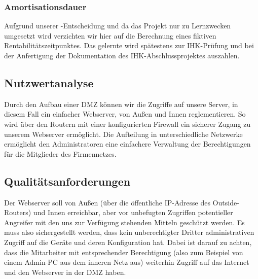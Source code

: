 
\subsubsection{Amortisationsdauer}
\label{sec:Amortisationsdauer}
Aufgrund unserer -Entscheidung und da das Projekt nur zu Lernzwecken umgesetzt wird verzichten wir hier auf die Berechnung eines fiktiven Rentabilitätszeitpunktes. Das gelernte wird spätestens zur \ac{IHK}-Prüfung und bei der Anfertigung der Dokumentation des \ac{IHK}-Abschlussprojektes auszahlen.

\subsection{Nutzwertanalyse}
\label{sec:Nutzwertanalyse}
Durch den Aufbau einer \ac{DMZ} können wir die Zugriffe auf unsere Server, in diesem Fall ein einfacher Webserver, von Außen und Innen reglementieren. So wird über den Routern mit einer konfigurierten Firewall ein sicherer Zugang zu unserem Webserver ermöglicht. Die Aufteilung in unterschiedliche Netzwerke ermöglicht den Administratoren eine einfachere Verwaltung der Berechtigungen für die Mitglieder des Firmennetzes.


\subsection{Qualitätsanforderungen}
\label{sec:Qualitaetsanforderungen}
Der Webserver soll von Außen (über die öffentliche \ac{IP}-Adresse des Outside-Routers) und Innen erreichbar, aber vor unbefugten Zugriffen potentieller Angreifer mit den uns zur Verfügung stehenden Mitteln geschützt werden. Es muss also sichergestellt werden, dass kein unberechtigter Dritter administrativen Zugriff auf die Geräte und deren Konfiguration hat. Dabei ist darauf zu achten, dass die Mitarbeiter mit entsprechender Berechtigung (also zum Beispiel von einem Admin-\ac{PC} aus dem inneren Netz aus) weiterhin Zugriff auf das Internet und den Webserver in der \ac{DMZ} haben.

